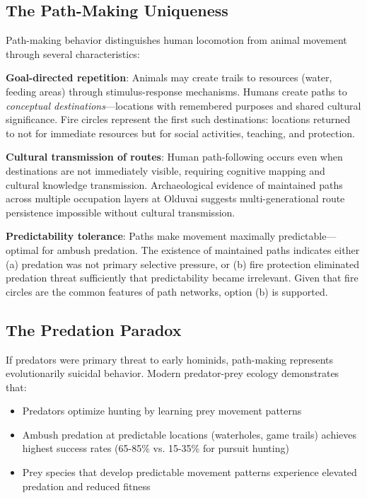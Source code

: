 \subsection{The Path-Making Uniqueness}

Path-making behavior distinguishes human locomotion from animal movement through several characteristics:

\textbf{Goal-directed repetition}: Animals may create trails to resources (water, feeding areas) through stimulus-response mechanisms. Humans create paths to \textit{conceptual destinations}—locations with remembered purposes and shared cultural significance. Fire circles represent the first such destinations: locations returned to not for immediate resources but for social activities, teaching, and protection.

\textbf{Cultural transmission of routes}: Human path-following occurs even when destinations are not immediately visible, requiring cognitive mapping and cultural knowledge transmission. Archaeological evidence of maintained paths across multiple occupation layers at Olduvai suggests multi-generational route persistence impossible without cultural transmission.

\textbf{Predictability tolerance}: Paths make movement maximally predictable—optimal for ambush predation. The existence of maintained paths indicates either (a) predation was not primary selective pressure, or (b) fire protection eliminated predation threat sufficiently that predictability became irrelevant. Given that fire circles are the common features of path networks, option (b) is supported.

\subsection{The Predation Paradox}

If predators were primary threat to early hominids, path-making represents evolutionarily suicidal behavior. Modern predator-prey ecology demonstrates that:

\begin{itemize}
\item Predators optimize hunting by learning prey movement patterns
\item Ambush predation at predictable locations (waterholes, game trails) achieves highest success rates (65-85\% vs. 15-35\% for pursuit hunting) \citep{schaller1972serengeti}
\item Prey species that develop predictable movement patterns experience elevated predation and reduced fitness
\end{itemize}

